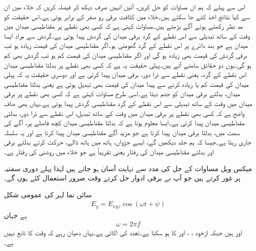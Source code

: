اس سے پہلے کہ ہم ان مساوات کو حل کریں، آئیں انہیں صرف دیکھ کر فیصلہ کریں کہ خلاء میں ان سے  کیا نتائج اخذ کئے جا سکتے ہیں۔خلاء میں کثافت برقی رو   صفر کے برابر ہوتی ہے۔اس حقیقت کو مد نظر رکھتے ہوئے آگے بڑھتے ہیں۔مساوات  کہتی ہے کہ کسی بھی نقطے پر مقناطیسی میدان میں وقت کے ساتھ تبدیلی سے اس نقطے کے گرد برقی میدان کی گردش پیدا ہوتی ہے۔گردش سے مراد ایسا میدان ہے جو بند دائرے پر اس نقطے کے گرد گھومتی ہو۔اگر مقناطیسی میدان کی قیمت زیادہ ہو تب برقی گردش کی قیمت بھی زیادہ ہو گی اور اگر مقناطیسی میدان کی قیمت کم ہو تب گردش بھی کم ہو گی۔یوں دو حقائق سامنے آتے ہیں۔پہلی حقیقت یہ ہے کہ کسی بھی نقطے پر بدلتا مقناطیسی میدان اس نقطے کے گرد، یعنی نقطے سے ذرا دور، برقی میدان پیدا کرتی ہے اور دوسری حقیقت یہ کہ پہلی میدان کی قیمت کم یا زیادہ کرنے سے پیدا میدان کی قیمت بھی تبدیل ہوتی ہے یعنی بدلتا مقناطیسی میدان، بدلتے برقی میدان کو جنم دیتا ہے۔اسی طرح مساوات  کہتی ہے کہ کسی بھی نقطے پر برقی میدان میں وقت کے ساتھ تبدیلی سے اس نقطے کے گرد مقناطیسی گردش پیدا ہوتی ہے۔یہاں بھی صاف واضح ہے کہ کسی بھی نقطے پر برقی میدان میں وقت کے ساتھ تبدیل، اس نقطے سے ذرا دور، بدلتی مقناطیسی میدان پیدا کرتی ہے۔ایسا معلوم ہوتا ہے کہ بدلتا مقناطیسی میدان کچھ فاصلے پر، آگے کی سمت میں، بدلتا برقی میدان پیدا کرتا ہے جو مزید آگے مقناطیسی میدان پیدا کرتا ہے اور یہ سلسلہ جاری رہتا ہے۔جیسا کہ ہم جلد دیکھیں گے، ایسے جڑواں، ہاتھ میں ہاتھ ڈالے، حرکت کرتے بدلتے برقی اور بدلتے مقناطیسی میدان کی رفتار  یعنی تقریباً  ہے جو خلاء میں روشنی کی رفتار ہے۔

میکس ویل مساوات کے حل  کی مدد سے نہایت آسان ہو جاتے ہیں لہٰذا پہلے دوری سمتیہ پر غور کرتے ہیں جو آپ نے برقی ادوار حل کرتے وقت ضرور استعمال کئے ہوں گے۔

سائن نما لہر کی عمومی شکل 
\begin{align}\label{مساوات_موج_اصل_سائن_نما_تفاعل}
E_y =E_{xyz} \cos (\omega t +\psi)
\end{align} 
ہے جہاں
\begin{align}
\omega =2\pi f
\end{align}
 اور   ہیں جبکہ  ازخود ، ،  اور  کا  ہو سکتا ہے۔تعدد  کی اکائی  ہے۔یہاں دھیان رہے کہ  وقت  کا تابع نہیں ہے۔

